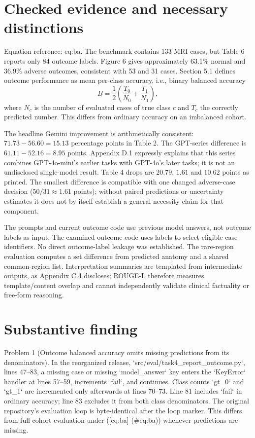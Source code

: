 \documentclass[10pt]{article}
\begin{document}
\section*{Checked evidence and necessary distinctions}
Equation reference: eq:ba. The benchmark contains 133 MRI cases, but Table 6 reports only 84 outcome labels. Figure 6 gives approximately 63.1\% normal and 36.9\% adverse outcomes, consistent with 53 and 31 cases. Section 5.1 defines outcome performance as mean per-class accuracy, i.e., binary balanced accuracy \[
 B=\frac12\left(\frac{T_0}{N_0}+\frac{T_1}{N_1}\right),\] where \(N_c\) is the number of evaluated cases of true class \(c\) and \(T_c\) the correctly predicted number. This differs from ordinary accuracy on an imbalanced cohort.\par
The headline Gemini improvement is arithmetically consistent: \(71.73-56.60=15.13\) percentage points in Table 2. The GPT-series difference is \(61.11-52.16=8.95\) points. Appendix D.1 expressly explains that this series combines GPT-4o-mini’s earlier tasks with GPT-4o’s later tasks; it is not an undisclosed single-model result. Table 4 drops are \(20.79\), \(1.61\) and \(10.62\) points as printed. The smallest difference is compatible with one changed adverse-case decision (\(50/31\approx1.61\) points); without paired predictions or uncertainty estimates it does not by itself establish a general necessity claim for that component.\par
The prompts and current outcome code use previous model answers, not outcome labels as input. The examined outcome code uses labels to select eligible case identifiers. No direct outcome-label leakage was established. The rare-region evaluation computes a set difference from predicted anatomy and a shared common-region list. Interpretation summaries are templated from intermediate outputs, as Appendix C.4 discloses; ROUGE-L therefore measures template/content overlap and cannot independently validate clinical factuality or free-form reasoning.\par
\section*{Substantive finding}
Problem 1 (Outcome balanced accuracy omits missing predictions from its denominators).  In the reorganized release, `src/eval/task4\_report\_outcome.py`, lines 47–83, a missing case or missing `model\_answer` key enters the `KeyError` handler at lines 57–59, increments `fail`, and continues. Class counts `gt\_0` and `gt\_1` are incremented only afterwards at lines 70–73. Line 81 includes `fail` in ordinary accuracy; line 83 excludes it from both class denominators. The original repository’s evaluation loop is byte-identical after the loop marker. This differs from full-cohort evaluation under ([eq:ba] (\#eq:ba)) whenever predictions are missing.\par
\end{document}

